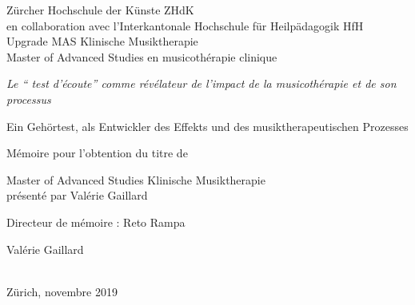 
\begin{titlepage}
 \begin{center}
    \Large
     Zürcher Hochschule der Künste ZHdK\\
 	en collaboration avec l'Interkantonale Hochschule für
        Heilpädagogik HfH \\
	 Upgrade MAS Klinische Musiktherapie \\ Master of Advanced Studies en musicothérapie clinique\\
  \vfill
  { \LARGE
\emph{Le `` test d'écoute'' comme  révélateur de l'impact
  de la musicothérapie et de son processus }\\ \bigskip


Ein Gehörtest, als Entwickler des Effekts und des
musiktherapeutischen Prozesses} 
 \vfill
 
Mémoire pour l'obtention du titre de

Master of Advanced Studies Klinische Musiktherapie \\ présenté par Valérie Gaillard

{\large Directeur de mémoire : Reto Rampa}


 {\large

	 Valérie Gaillard \\  \hfill \\
	 \rule{0mm}{1pt} \hfill Zürich, novembre 2019}
 \end{center}
\end{titlepage}
